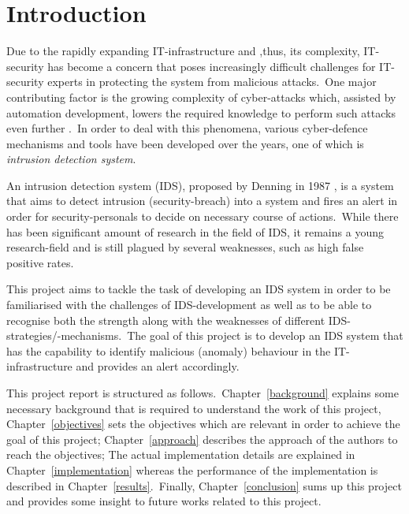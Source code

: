 \chapter{Introduction}
\label{introduction}

	Due to the rapidly expanding IT-infrastructure and ,thus, its complexity, IT-security has become a concern that poses increasingly difficult challenges for IT-security experts in protecting the system from malicious attacks.\ One major contributing factor is the growing complexity of cyber-attacks which, assisted by automation development, lowers the required knowledge to perform such attacks even further \cite{McHugh:IntrusionAndIntrusionDetection}.\ In order to deal with this phenomena, various cyber-defence mechanisms and tools have been developed over the years, one of which is \textit{intrusion detection system}.
	
	An intrusion detection system (IDS), proposed by Denning in 1987 \cite{Denning:IntrusionDetectionModel}, is a system that aims to detect intrusion (security-breach) into a system and fires an alert in order for security-personals to decide on necessary course of actions.\ While there has been significant amount of research in the field of IDS, it remains a young research-field and is still plagued by several weaknesses, such as high false positive rates.
	
	This project aims to tackle the task of developing an IDS system in order to be familiarised with the challenges of IDS-development as well as to be able to recognise both the strength along with the weaknesses of different IDS-strategies/-mechanisms.\ The goal of this project is to develop an IDS system that has the capability to identify malicious (anomaly) behaviour in the IT-infrastructure and provides an alert accordingly.
	
	This project report is structured as follows.\ Chapter~\ref{background} explains some necessary background that is required to understand the work of this project, Chapter~\ref{objectives} sets the objectives which are relevant in order to achieve the goal of this project; Chapter~\ref{approach} describes the approach of the authors to reach the objectives; The actual implementation details are explained in Chapter~\ref{implementation} whereas the performance of the implementation is described in Chapter~\ref{results}.\ Finally, Chapter~\ref{conclusion} sums up this project and provides some insight to future works related to this project.
